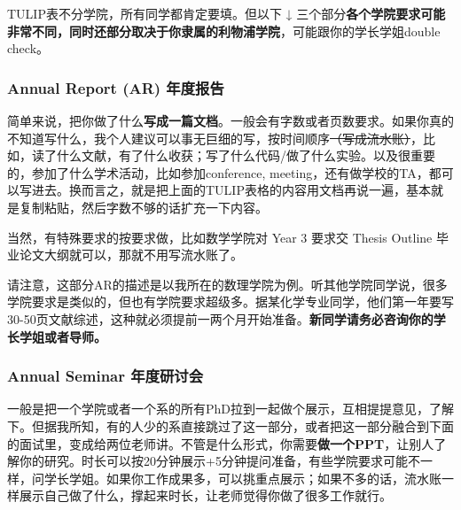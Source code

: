 TULIP表不分学院，所有同学都肯定要填。但以下 ↓ 三个部分\textbf{各个学院要求可能非常不同，同时还部分取决于你隶属的利物浦学院}，可能跟你的学长学姐double check。

\subsubsection{Annual Report (AR) 年度报告}
简单来说，把你做了什么\textbf{写成一篇文档}。一般会有字数或者页数要求。如果你真的不知道写什么，我个人建议可以事无巨细的写，按时间顺序\sout{（写成流水账）}，比如，读了什么文献，有了什么收获；写了什么代码/做了什么实验。以及很重要的，参加了什么学术活动，比如参加conference, meeting，还有做学校的TA，都可以写进去。换而言之，就是把上面的TULIP表格的内容用文档再说一遍，基本就是复制粘贴，然后字数不够的话扩充一下内容。

当然，有特殊要求的按要求做，比如数学学院对 Year 3 要求交 Thesis Outline 毕业论文大纲就可以，那就不用写流水账了。

请注意，这部分AR的描述是以我所在的数理学院为例。听其他学院同学说，很多学院要求是类似的，但也有学院要求超级多。据某化学专业同学，他们第一年要写30-50页文献综述，这种就必须提前一两个月开始准备。\textbf{新同学请务必咨询你的学长学姐或者导师。}

\subsubsection{Annual Seminar 年度研讨会}
一般是把一个学院或者一个系的所有PhD拉到一起做个展示，互相提提意见，了解下。但据我所知，有的人少的系直接跳过了这一部分，或者把这一部分融合到下面的面试里，变成给两位老师讲。不管是什么形式，你需要\textbf{做一个PPT}，让别人了解你的研究。时长可以按20分钟展示+5分钟提问准备，有些学院要求可能不一样，问学长学姐。如果你工作成果多，可以挑重点展示；如果不多的话，流水账一样展示自己做了什么，撑起来时长，让老师觉得你做了很多工作就行。

